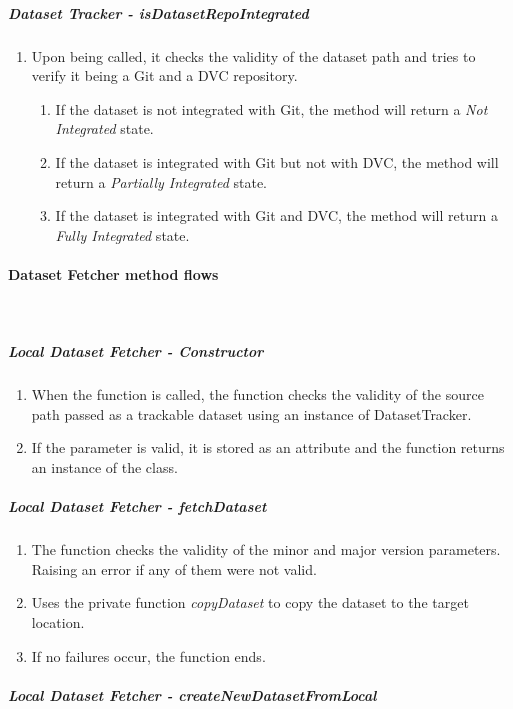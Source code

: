 \subparagraph{Dataset Tracker - isDatasetRepoIntegrated}

\begin{enumerate}
    \item Upon being called, it checks the validity of the dataset path and tries to verify it being a Git and a DVC repository.
    \begin{enumerate}
        \item If the dataset is not integrated with Git, the method will return a \emph{Not Integrated} state.
        \item If the dataset is integrated with Git but not with DVC, the method will return a \emph{Partially Integrated} state.
        \item If the dataset is integrated with Git and DVC, the method will return a \emph{Fully Integrated} state.
    \end{enumerate}
\end{enumerate}

\paragraph{Dataset Fetcher method flows} \mbox{}\\

\subparagraph{Local Dataset Fetcher - Constructor}

\begin{enumerate}
    \item When the function is called, the function checks the validity of the source path passed as a trackable dataset using an instance of DatasetTracker.
    \item If the parameter is valid, it is stored as an attribute and the function returns an instance of the class.
\end{enumerate}

\subparagraph{Local Dataset Fetcher - fetchDataset}

\begin{enumerate}
    \item The function checks the validity of the minor and major version parameters. Raising an error if any of them were not valid.
    \item Uses the private function \emph{copyDataset} to copy the dataset to the target location.
    \item If no failures occur, the function ends.
\end{enumerate}

\subparagraph{Local Dataset Fetcher - createNewDatasetFromLocal}

